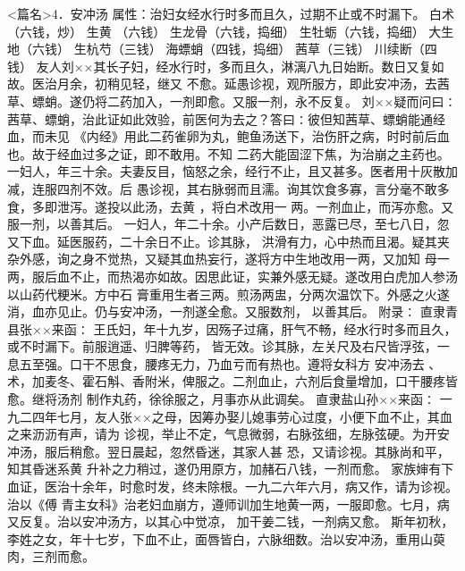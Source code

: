 \documentclass[a4paper,12pt,UTF8,twoside]{ctexbook}
\begin{document}
<篇名>4．安冲汤
属性：治妇女经水行时多而且久，过期不止或不时漏下。 
白术（六钱，炒） 生黄 （六钱） 生龙骨（六钱，捣细） 生牡蛎（六钱，捣细） 大生地（六钱） 
生杭芍（三钱） 海螵蛸（四钱，捣细） 茜草（三钱） 川续断（四钱） 
友人刘××其长子妇，经水行时，多而且久，淋漓八九日始断。数日又复如故。医治月余，初稍见轻，继又 
不愈。延愚诊视，观所服方，即此安冲汤，去茜草、螵蛸。遂仍将二药加入，一剂即愈。又服一剂，永不反复。 
刘××疑而问曰∶茜草、螵蛸，治此证如此效验，前医何为去之？答曰∶彼但知茜草、螵蛸能通经血，而未见 
《内经》用此二药雀卵为丸，鲍鱼汤送下，治伤肝之病，时时前后血也。故于经血过多之证，即不敢用。不知 
二药大能固涩下焦，为治崩之主药也。 
一妇人，年三十余。夫妻反目，恼怒之余，经行不止，且又甚多。医者用十灰散加减，连服四剂不效。后 
愚诊视，其右脉弱而且濡。询其饮食多寡，言分毫不敢多食，多即泄泻。遂投以此汤，去黄 ，将白术改用一 
两。一剂血止，而泻亦愈。又服一剂，以善其后。 
一妇人，年二十余。小产后数日，恶露已尽，至七八日，忽又下血。延医服药，二十余日不止。诊其脉， 
洪滑有力，心中热而且渴。疑其夹杂外感，询之身不觉热，又疑其血热妄行，遂将方中生地改用一两，又加知 
母一两，服后血不止，而热渴亦如故。因思此证，实兼外感无疑。遂改用白虎加人参汤以山药代粳米。方中石 
膏重用生者三两。煎汤两盅，分两次温饮下。外感之火遂消，血亦见止。仍与安冲汤，一剂遂全愈。又服数剂， 
以善其后。 
附录∶ 
直隶青县张××来函∶ 
王氏妇，年十九岁，因殇子过痛，肝气不畅，经水行时多而且久，或不时漏下。前服逍遥、归脾等药， 
皆无效。诊其脉，左关尺及右尺皆浮弦，一息五至强。口干不思食，腰疼无力，乃血亏而有热也。遵将女科方 
安冲汤去 、术，加麦冬、霍石斛、香附米，俾服之。二剂血止，六剂后食量增加，口干腰疼皆愈。继将汤剂 
制作丸药，徐徐服之，月事亦从此调矣。 
直隶盐山孙××来函∶ 
一九二四年七月，友人张××之母，因筹办娶儿媳事劳心过度，小便下血不止，其血之来沥沥有声，请为 
诊视，举止不定，气息微弱，右脉弦细，左脉弦硬。为开安冲汤，服后稍愈。翌日晨起，忽然昏迷，其家人甚 
恐，又请诊视。其脉尚和平，知其昏迷系黄 升补之力稍过，遂仍用原方，加赭石八钱，一剂而愈。 
家族婶有下血证，医治十余年，时愈时发，终未除根。一九二六年六月，病又作，请为诊视。治以《傅 
青主女科》治老妇血崩方，遵师训加生地黄一两，一服即愈。七月，病又反复。治以安冲汤方，以其心中觉凉， 
加干姜二钱，一剂病又愈。 
斯年初秋，李姓之女，年十七岁，下血不止，面唇皆白，六脉细数。治以安冲汤，重用山萸肉，三剂而愈。 
\end{document}
